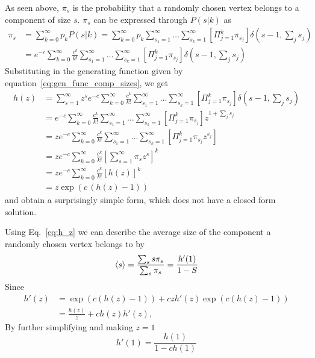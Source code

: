 As seen above, $\pi_s$ is the probability that a randomly chosen vertex belongs to a component of size $s$.
$\pi_s$ can be expressed through $P(s|k)$ as
\begin{align}
	\pi_s & = \sum_{k=0}^\infty p_k P(s| k) = \sum_{k=0}^\infty p_k \sum_{s_1 = 1}^{\infty} \ldots \sum_{s_k = 1}^{\infty} \left[ \Pi_{j=1}^k \pi_{s_j} \right] \delta(s-1, \sum_j s_j) \\
	      & = e^{-c} \sum_{k=0}^\infty \frac{c^k}{k!} \sum_{s_1 = 1}^{\infty} \ldots \sum_{s_k = 1}^{\infty} \left[ \Pi_{j=1}^k \pi_{s_j} \right] \delta(s-1, \sum_j s_j)
\end{align}
Substituting in the generating function given by equation~\ref{eq:gen_func_comp_sizes}, we get
\begin{align}
	h(z) & = \sum_{s=1}^{\infty} z^s e^{-c} \sum_{k=0}^\infty \frac{c^k}{k!} \sum_{s_1 = 1}^{\infty} \ldots \sum_{s_k = 1}^{\infty} \left[ \Pi_{j=1}^k \pi_{s_j} \right] \delta(s-1, \sum_j s_j) \\
	     & = e^{-c} \sum_{k=0}^\infty \frac{c^k}{k!} \sum_{s_1 = 1}^{\infty} \ldots \sum_{s_k = 1}^{\infty} \left[ \Pi_{j=1}^k \pi_{s_j} \right] z^{1+\sum_j s_j} \\
	     & = z e^{-c} \sum_{k=0}^\infty \frac{c^k}{k!} \sum_{s_1 = 1}^{\infty} \ldots \sum_{s_k = 1}^{\infty} \left[ \Pi_{j=1}^k \pi_{s_j} z ^ {s_j}\right] \\
	     & = z e^{-c} \sum_{k=0}^\infty \frac{c^k}{k!} \left[ \sum_{s=1}^{\infty} \pi_s z^s \right]^k \\
	     & = z e^{-c} \sum_{k=0}^\infty \frac{c^k}{k!} \left[ h(z) \right]^k \\
	     & = z \exp\left( c\, (h(z) -1) \right)~\label{eq:h_z}
\end{align}
and obtain a surprisingly simple form, which does not have a closed form solution.

Using Eq.~\ref{eq:h_z} we can describe the average size of the component a randomly chosen vertex belongs to by
\begin{equation}
	\left< s \right> = \frac{\sum_s s \pi_s}{\sum_s \pi_s} = \frac{h'(1)}{1-S}
\end{equation}
Since
\begin{align*}
	h'(z) & = \exp\left( c(h(z) - 1)  \right) 
	        + c z h'(z)\exp\left( c(h(z) - 1)  \right) \\
	      & = \frac{h(z)}{z} + c h(z) h'(z),
\end{align*}
By further simplifying and making $z=1$
\begin{equation}
	h'(1) = \frac{h(1)}{1- ch(1)}
\end{equation}


